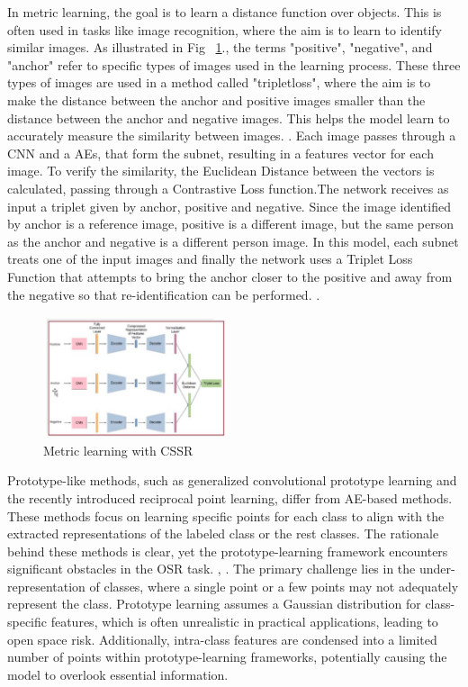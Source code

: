 \documentclass{gji}
\begin{document}
 In metric learning, the goal is to learn a distance function over objects. This is often used in tasks like image recognition, where the aim is to learn to identify similar images.
 As illustrated in Fig ~\ref{fig1}.,  the terms "positive", "negative", and "anchor" refer to specific types of images used in the learning process. These three types of images are used in a method called "tripletloss", where the aim is to make the distance between the anchor and positive images smaller than the distance between the anchor and negative images. This helps the model learn to accurately measure the similarity between images. \cite {10}.  Each image passes through a CNN and a AEs, that form the subnet, resulting in a features vector for each image. To verify the similarity, the Euclidean Distance between the vectors is calculated, passing through a Contrastive Loss function.The network receives as input a triplet given by anchor, positive and negative. Since the image identified by anchor is a reference image, positive is a different image, but the same person as the anchor and negative is a different person image. In this model, each subnet treats one of the input images and finally the network uses a Triplet Loss Function that attempts to bring the anchor closer to the positive and away from the negative so that re-identification can be performed.  \cite {10}. 
\begin{figure}
\label{fig1}
 \centering
 \includegraphics[width=0.48\textwidth]{fig1.png}
     \caption{Metric learning with CSSR}
   
\end{figure}
 
 
 Prototype-like methods, such as generalized convolutional prototype learning and the recently introduced reciprocal point learning, differ from AE-based methods. These methods focus on learning specific points for each class to align with the extracted representations of the labeled class or the rest classes. The rationale behind these methods is clear, yet the prototype-learning framework encounters significant obstacles in the OSR task.   \cite {10},  \cite {36}. The primary challenge lies in the under-representation of classes, where a single point or a few points may not adequately represent the class. Prototype learning assumes a Gaussian distribution for class-specific features, which is often unrealistic in practical applications, leading to open space risk. Additionally, intra-class features are condensed into a limited number of points within prototype-learning frameworks, potentially causing the model to overlook essential information. 
 
\end{document}
